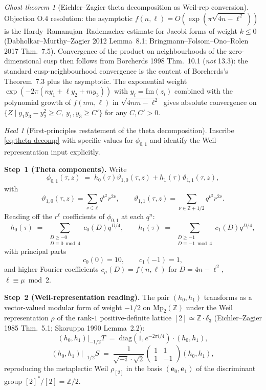 \documentclass[11pt]{article}
\theoremstyle{definition}
\theoremstyle{remark}
\newtheorem{heal}{Heal}
\newtheorem{ghost}[theorem]{Ghost theorem}
\newcommand{\ZZ}{\mathbb{Z}}
\begin{document}
\begin{ghost}[Eichler--Zagier theta decomposition as Weil-rep conversion]
Objection O.4 resolution: the asymptotic $f(n,\ell)=O(\exp(\pi
\sqrt{4n-\ell^2}))$ is the Hardy--Ramanujan--Rademacher estimate
for Jacobi forms of weight $k\leq 0$ (Dabholkar--Murthy--Zagier 2012
Lemma~8.1; Bringmann--Folsom--Ono--Rolen 2017 Thm.~7.5). Convergence
of the product on neighbourhoods of the zero-dimensional cusp then
follows from Borcherds 1998 Thm.~10.1 (\emph{not} 13.3): the standard
cusp-neighbourhood convergence is the content of Borcherds's Theorem~7.3
plus the asymptotic. The exponential weight
$\exp(-2\pi(n y_1+\ell y_2+m y_3))$ with $y_i=\mathrm{Im}(z_i)$ combined
with the polynomial growth of $f(nm,\ell)$ in $\sqrt{4nm-\ell^2}$
gives absolute convergence on
$\{Z\mid y_1 y_3-y_2^2\geq C,\ y_1,y_3\geq C'\}$ for any $C,C'>0$.
\end{ghost}

\begin{heal}[First-principles restatement of the theta decomposition]
\label{hl:cycle1}
Inscribe \eqref{eq:theta-decomp} with specific values for $\phi_{0,1}$
and identify the Weil-representation input explicitly.

\textbf{Step~1 (Theta components).} Write
\[
  \phi_{0,1}(\tau,z)\;=\;h_0(\tau)\vartheta_{1,0}(\tau,z)
  +h_1(\tau)\vartheta_{1,1}(\tau,z),
\]
with
\[
  \vartheta_{1,0}(\tau,z)=\sum_{\nu\in\ZZ}q^{\nu^2}r^{2\nu},\qquad
  \vartheta_{1,1}(\tau,z)=\sum_{\nu\in\ZZ+1/2}q^{\nu^2}r^{2\nu}.
\]
Reading off the $r^\ell$ coefficients of $\phi_{0,1}$ at each $q^n$:
\[
  h_0(\tau)\;=\;\sum_{\substack{D\geq -0\\D\equiv 0\bmod 4}}c_0(D)q^{D/4},
  \qquad
  h_1(\tau)\;=\;\sum_{\substack{D\geq -1\\D\equiv -1\bmod 4}}c_1(D)q^{D/4},
\]
with principal parts
\[
  c_0(0)=10,\qquad c_1(-1)=1,
\]
and higher Fourier coefficients $c_\mu(D)=f(n,\ell)$ for $D=4n-\ell^2$,
$\ell\equiv\mu\bmod 2$.

\textbf{Step~2 (Weil-representation reading).} The pair $(h_0,h_1)$
transforms as a vector-valued modular form of weight $-1/2$ on
$\mathrm{Mp}_2(\ZZ)$ under the Weil representation $\rho$ of the
rank-$1$ positive-definite lattice $[2]\simeq\ZZ\cdot\delta_3$
(Eichler--Zagier 1985 Thm.~5.1; Skoruppa 1990 Lemma~2.2):
\[
  (h_0,h_1)\bigl|_{-1/2}T\;=\;\mathrm{diag}(1,e^{-2\pi i/4})\cdot(h_0,h_1),
\]
\[
  (h_0,h_1)\bigl|_{-1/2}S\;=\;\frac{1}{\sqrt{-i}\cdot\sqrt 2}
  \begin{pmatrix}1&1\\1&-1\end{pmatrix}(h_0,h_1),
\]
reproducing the metaplectic Weil $\rho_{[2]}$ in the basis
$(\mathbf e_0,\mathbf e_1)$ of the discriminant group $[2]^*/[2]=\ZZ/2$.


\end{heal}
\end{document}
